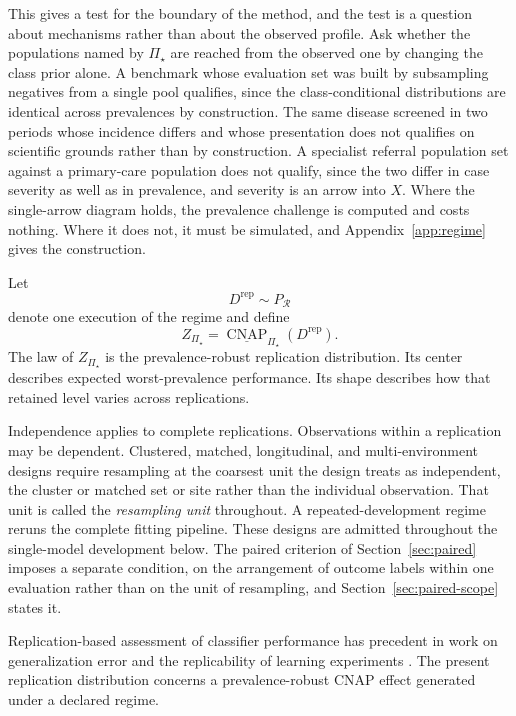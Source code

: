 \documentclass[11pt]{article}
\newcommand{\CNAP}{\operatorname{CNAP}}
\newcommand{\Regime}{\mathcal{R}}
\newcommand{\PSet}{\Pi_\star}
\newcommand{\RobCNAP}{\underline{\CNAP}_{\PSet}}
\theoremstyle{remark}
\begin{document}
This gives a test for the boundary of the method, and the test is a question about mechanisms rather than about the observed profile. Ask whether the populations named by $\PSet$ are reached from the observed one by changing the class prior alone. A benchmark whose evaluation set was built by subsampling negatives from a single pool qualifies, since the class-conditional distributions are identical across prevalences by construction. The same disease screened in two periods whose incidence differs and whose presentation does not qualifies on scientific grounds rather than by construction. A specialist referral population set against a primary-care population does not qualify, since the two differ in case severity as well as in prevalence, and severity is an arrow into $X$. Where the single-arrow diagram holds, the prevalence challenge is computed and costs nothing. Where it does not, it must be simulated, and Appendix~\ref{app:regime} gives the construction.

Let
\[
D^{\mathrm{rep}}\sim P_{\Regime}
\]
denote one execution of the regime and define
\begin{equation}
Z_{\PSet}
=
\RobCNAP(D^{\mathrm{rep}}).
\label{eq:robust-replication-effect}
\end{equation}
The law of $Z_{\PSet}$ is the prevalence-robust replication distribution. Its center describes expected worst-prevalence performance. Its shape describes how that retained level varies across replications.

Independence applies to complete replications. Observations within a replication may be dependent. Clustered, matched, longitudinal, and multi-environment designs require resampling at the coarsest unit the design treats as independent, the cluster or matched set or site rather than the individual observation. That unit is called the \emph{resampling unit} throughout. A repeated-development regime reruns the complete fitting pipeline. These designs are admitted throughout the single-model development below. The paired criterion of Section~\ref{sec:paired} imposes a separate condition, on the arrangement of outcome labels within one evaluation rather than on the unit of resampling, and Section~\ref{sec:paired-scope} states it.

Replication-based assessment of classifier performance has precedent in work on generalization error and the replicability of learning experiments \cite{nadeau2003inference,bouckaert2004estimating}. The present replication distribution concerns a prevalence-robust CNAP effect generated under a declared regime.
\end{document}
